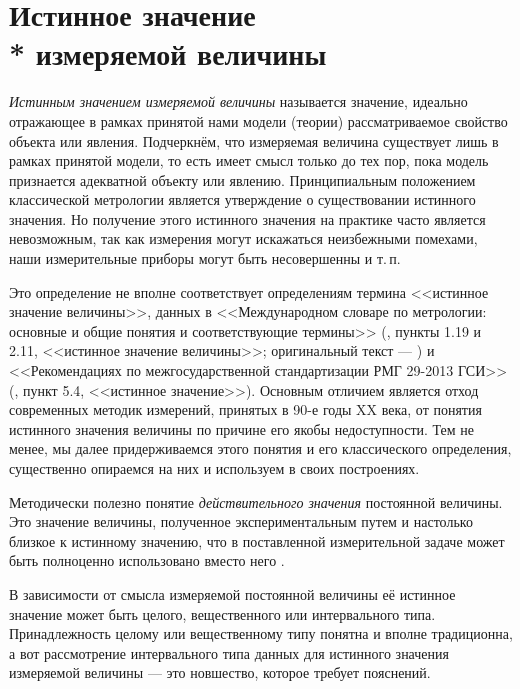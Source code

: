 \documentclass[a5paper,openany]{book}
\begin{document}
\section[Истинное значение измеряемой величины]%
        {Истинное значение \\* измеряемой величины} 
\label{TrueValueSect} 
  
  
\textit{Истинным значением измеряемой величины} называется значение, идеально отражающее 
в рамках принятой нами модели (теории) рассматриваемое свойство объекта или явления. 
Подчеркнём, что измеряемая величина существует лишь в рамках принятой модели, то есть 
имеет смысл только до тех пор, пока модель признается адекватной объекту или явлению. 
Принципиальным положением классической метрологии является утверждение о существовании 
истинного значения. Но получение этого истинного значения на практике часто является 
невозможным, так как измерения могут искажаться неизбежными помехами, наши измерительные 
приборы могут быть несовершенны и т.\,п. 
  
Это определение не вполне соответствует  определениям термина <<истинное значение 
величины>>, данных в <<Международном словаре по метрологии: основные и общие понятия 
и  соответствующие термины>> (\cite{MetrolVocab}, пункты 1.19 и 2.11, <<истинное  
значение величины>>; оригинальный текст --- \cite{MetrolVocabOrig}) и <<Рекомендациях 
по межгосударственной стандартизации РМГ 29-2013 ГСИ>> (\cite{RMG29-2013}, пункт 5.4, 
<<истинное значение>>). Основным отличием является отход современных методик измерений, 
принятых в 90-е годы XX века, от понятия истинного значения величины по причине 
его якобы недоступности. Тем не менее, мы далее придерживаемся этого понятия и его 
классического определения, существенно опираемся на них и используем в своих 
построениях. 
  
Методически полезно понятие \emph{действительного значения} постоянной величины. Это 
значение величины, полученное экспериментальным путем и настолько близкое к истинному 
значению, что в поставленной измерительной задаче может быть полноценно использовано 
вместо него \cite{RMG29-2013}.          
  
В зависимости от смысла измеряемой постоянной величины её истинное значение может быть 
целого, вещественного или интервального типа. Принадлежность целому или вещественному 
типу понятна и вполне традиционна, а вот рассмотрение интервального типа данных для 
истинного значения измеряемой величины --- это новшество, которое требует пояснений.  
  
\end{document}
